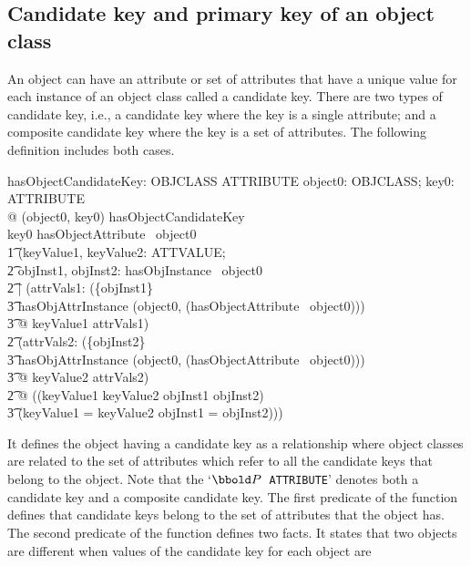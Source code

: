 \documentclass{entcs}
\begin{document}
\subsection{Candidate key and primary key of an object class}
An object can have an attribute or set of attributes that have a
unique value for each instance of an object class called a
candidate key. There are two types of candidate key, i.e., a
candidate key where the key is a single attribute; and a composite
candidate key where the key is a set of attributes. The following
definition includes both cases.
\begin{small}
\begin{axdef}
  hasObjectCandidateKey: OBJCLASS \rel  \power  ATTRIBUTE
\where
  \forall  object0: OBJCLASS; key0: \power  ATTRIBUTE \\
  @ (object0, key0) \in  hasObjectCandidateKey \\
  \iff  key0 \subseteq  hasObjectAttribute~ object0 \\
  \t1 \land  (\forall  keyValue1, keyValue2: \power  ATTVALUE;\\
  \t2 objInst1, objInst2: hasObjInstance~ object0\\
  \t2 | (\forall  attrVals1: \ran  (\{objInst1\} \\
  \t3 \dres  hasObjAttrInstance (object0, (hasObjectAttribute~
  object0)))\\
  \t3 @ keyValue1 \subseteq  attrVals1) \\
  \t2 \land  (\forall  attrVals2: \ran  (\{objInst2\} \\
  \t3 \dres  hasObjAttrInstance (object0, (hasObjectAttribute~ object0))) \\
  \t3 @ keyValue2 \subseteq  attrVals2) \\
  \t2 @ ((keyValue1 \neq  keyValue2 \implies  objInst1 \neq
  objInst2)\\
  \t3 \land  (keyValue1 = keyValue2 \implies  objInst1 = objInst2)))
\end{axdef}
\end{small}
It defines the object having a candidate key as a relationship
where object classes are related to the set of attributes which
refer to all the candidate keys that belong to the object. Note
that the `\texttt{$\power$ ATTRIBUTE}' denotes both a candidate
key and a composite candidate key. The first predicate of the
function defines that candidate keys belong to the set of
attributes that the object has. The second predicate of the
function defines two facts. It states that two objects are
different when values of the candidate key for each object are
\end{document}

